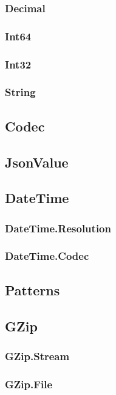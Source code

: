 \documentclass{article}
\begin{document}
\subsubsection{Decimal}

\subsubsection{Int64}

\subsubsection{Int32}

\subsubsection{String}

\subsection{Codec}

\subsection{JsonValue}

\subsection{DateTime}

\subsubsection{DateTime.Resolution}

\subsubsection{DateTime.Codec}

\subsection{Patterns}

\subsection{GZip}

\subsubsection{GZip.Stream}

\subsubsection{GZip.File}



\clearpage
\appendix
\end{document}
